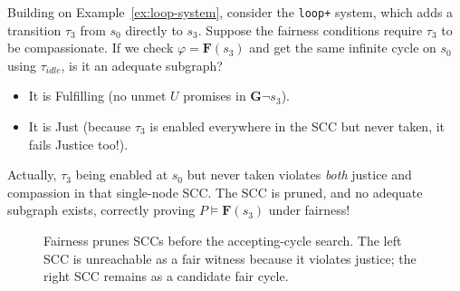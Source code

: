 \begin{example}
Building on Example~\ref{ex:loop-system}, consider the \texttt{loop+} system, which adds a transition $\tau_3$ from $s_0$ directly to $s_3$. 
Suppose the fairness conditions require $\tau_3$ to be compassionate. 
If we check $\varphi = \mathbf{F}(s_3)$ and get the same infinite cycle on $s_0$ using $\tau_{idle}$, is it an adequate subgraph? 
\begin{itemize}
  \item It is Fulfilling (no unmet $U$ promises in $\mathbf{G} \neg s_3$).
  \item It is Just (because $\tau_3$ is enabled everywhere in the SCC but never taken, it fails Justice too!).
\end{itemize}
Actually, $\tau_3$ being enabled at $s_0$ but never taken violates \emph{both} justice and compassion in that single-node SCC. The SCC is pruned, and no adequate subgraph exists, correctly proving $P \models \mathbf{F}(s_3)$ under fairness!
\end{example}

\begin{figure}[ht]
  \centering
  \caption{Fairness prunes SCCs before the accepting-cycle search.  The left
           SCC is unreachable as a fair witness because it violates justice;
           the right SCC remains as a candidate fair cycle.}
  \label{fig:ltl-fair-scc}
\end{figure}

